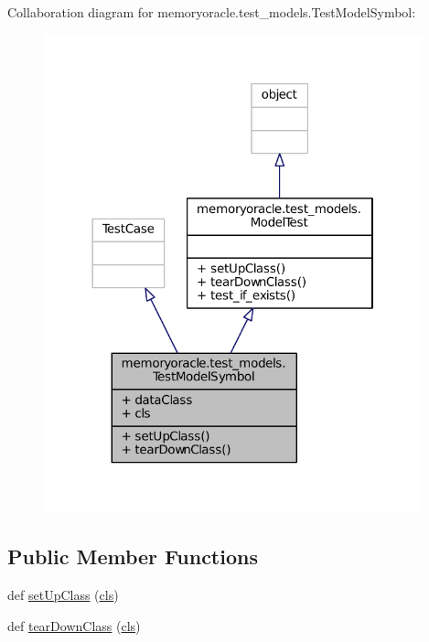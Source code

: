 Collaboration diagram for memoryoracle.\+test\+\_\+models.\+Test\+Model\+Symbol\+:\nopagebreak
\begin{figure}[H]
\begin{center}
\leavevmode
\includegraphics[width=310pt]{classmemoryoracle_1_1test__models_1_1TestModelSymbol__coll__graph}
\end{center}
\end{figure}
\subsection*{Public Member Functions}
\begin{DoxyCompactItemize}
\item 
def \hyperlink{classmemoryoracle_1_1test__models_1_1TestModelSymbol_a023b62b033168b73704efc5136b2b16e}{set\+Up\+Class} (\hyperlink{classmemoryoracle_1_1test__models_1_1TestModelSymbol_a5c56b8259f007ab311791a16b1e48501}{cls})
\item 
def \hyperlink{classmemoryoracle_1_1test__models_1_1TestModelSymbol_a506506e735e14f9007792818eda1f365}{tear\+Down\+Class} (\hyperlink{classmemoryoracle_1_1test__models_1_1TestModelSymbol_a5c56b8259f007ab311791a16b1e48501}{cls})
\end{DoxyCompactItemize}
